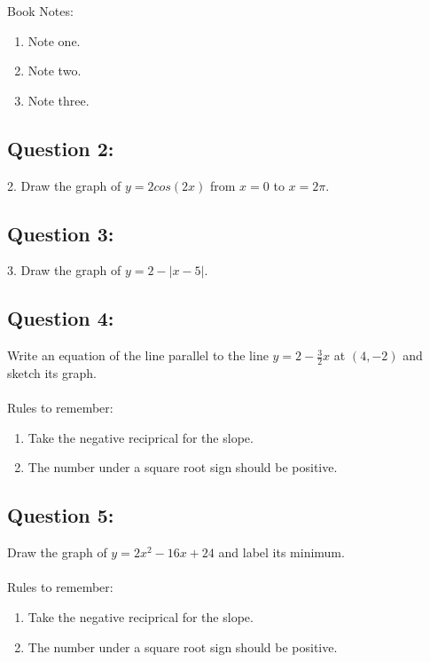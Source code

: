 \documentclass[12pt, letterpaper]{article}
\begin{document}
Book Notes:
\begin{enumerate}
  \item Note one.
  \item Note two.
  \item Note three.
\end{enumerate}

\subsection{Question 2:}
2. Draw the graph of $y=2cos(2x)$ from $x=0$ to $x=2\pi$.

\subsection{Question 3:}
3. Draw the graph of $y=2-|x-5|$.


\subsection{Question 4:}
Write an equation of the line parallel to the line 
  $y=2-\frac{3}{2}x$ at $(4,-2)$ and sketch its graph.
  \\\\
  Rules to remember:
  \begin{enumerate}
    \item Take the negative reciprical for the slope.
    \item The number under a square root sign should be positive.
  \end{enumerate}

\subsection{Question 5:}
  Draw the graph of $y=2x^2-16x+24$ and label its minimum.
  \\\\
  Rules to remember:
  \begin{enumerate}
    \item Take the negative reciprical for the slope.
    \item The number under a square root sign should be positive.
  \end{enumerate}
\end{document}
